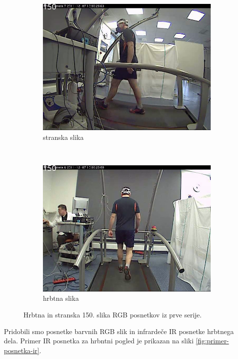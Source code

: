 \begin{figure}[htb]
	\centering
	\begin{subfigure}{0.45\columnwidth}
		\includegraphics[width=\columnwidth]{./Slike/normal-sv-150.png}
		\caption{stranska slika}
	\end{subfigure}
	~
	\begin{subfigure}{0.45\columnwidth}
		\includegraphics[width=\columnwidth]{./Slike/normal-bv-150.png}
		\caption{hrbtna slika}
	\end{subfigure}
	\caption{Hrbtna in stranska 150. slika RGB posnetkov iz prve serije.}
	\label{fig:primer-posnetka-rgb}
\end{figure}

Pridobili smo posnetke barvnih RGB slik in infrardeče IR posnetke hrbtnega dela. Primer IR posnetka za hrbntni pogled je prikazan na sliki \ref{fig:primer-posnetka-ir}.


